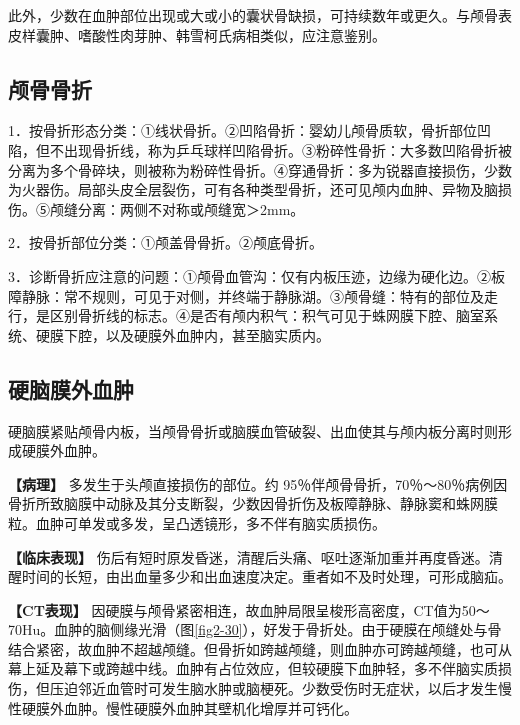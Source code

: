 此外，少数在血肿部位出现或大或小的囊状骨缺损，可持续数年或更久。与颅骨表皮样囊肿、嗜酸性肉芽肿、韩雪柯氏病相类似，应注意鉴别。

\subsection{颅骨骨折}

1．按骨折形态分类：①线状骨折。②凹陷骨折：婴幼儿颅骨质软，骨折部位凹陷，但不出现骨折线，称为乒乓球样凹陷骨折。③粉碎性骨折：大多数凹陷骨折被分离为多个骨碎块，则被称为粉碎性骨折。④穿通骨折：多为锐器直接损伤，少数为火器伤。局部头皮全层裂伤，可有各种类型骨折，还可见颅内血肿、异物及脑损伤。⑤颅缝分离：两侧不对称或颅缝宽＞2mm。

2．按骨折部位分类：①颅盖骨骨折。②颅底骨折。

3．诊断骨折应注意的问题：①颅骨血管沟：仅有内板压迹，边缘为硬化边。②板障静脉：常不规则，可见于对侧，并终端于静脉湖。③颅骨缝：特有的部位及走行，是区别骨折线的标志。④是否有颅内积气：积气可见于蛛网膜下腔、脑室系统、硬膜下腔，以及硬膜外血肿内，甚至脑实质内。

\subsection{硬脑膜外血肿}

硬脑膜紧贴颅骨内板，当颅骨骨折或脑膜血管破裂、出血使其与颅内板分离时则形成硬膜外血肿。

\textbf{【病理】} 多发生于头颅直接损伤的部位。约
95％伴颅骨骨折，70％～80％病例因骨折所致脑膜中动脉及其分支断裂，少数因骨折伤及板障静脉、静脉窦和蛛网膜粒。血肿可单发或多发，呈凸透镜形，多不伴有脑实质损伤。

\textbf{【临床表现】}
伤后有短时原发昏迷，清醒后头痛、呕吐逐渐加重并再度昏迷。清醒时间的长短，由出血量多少和出血速度决定。重者如不及时处理，可形成脑疝。

\textbf{【CT表现】}
因硬膜与颅骨紧密相连，故血肿局限呈梭形高密度，CT值为50～70Hu。血肿的脑侧缘光滑（图\ref{fig2-30}），好发于骨折处。由于硬膜在颅缝处与骨结合紧密，故血肿不超越颅缝。但骨折如跨越颅缝，则血肿亦可跨越颅缝，也可从幕上延及幕下或跨越中线。血肿有占位效应，但较硬膜下血肿轻，多不伴脑实质损伤，但压迫邻近血管时可发生脑水肿或脑梗死。少数受伤时无症状，以后才发生慢性硬膜外血肿。慢性硬膜外血肿其壁机化增厚并可钙化。

